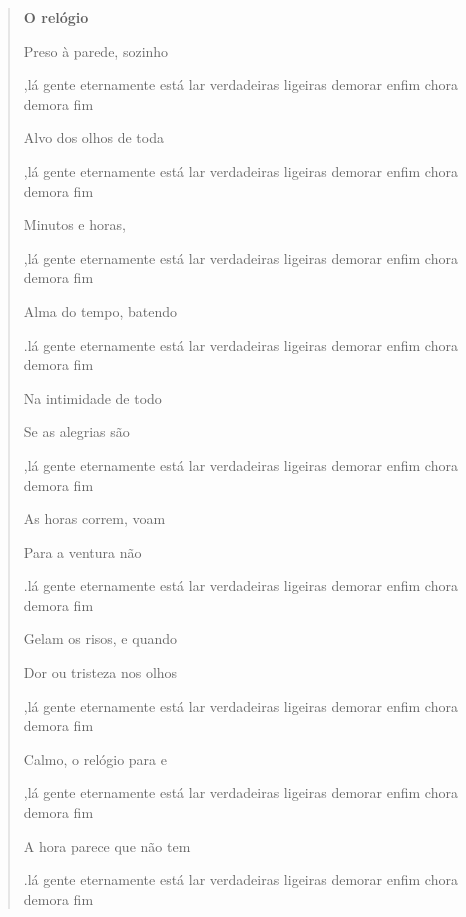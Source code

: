\begin{quote}
\textbf{O relógio}

Preso à parede, sozinho 

\coment,{lá
gente
eternamente
está
lar
verdadeiras
ligeiras
demorar
enfim
chora
demora
fim}

Alvo dos olhos de toda 

\coment,{lá
gente
eternamente
está
lar
verdadeiras
ligeiras
demorar
enfim
chora
demora
fim}

Minutos e horas, 

\coment,{lá
gente
eternamente
está
lar
verdadeiras
ligeiras
demorar
enfim
chora
demora
fim}

Alma do tempo, batendo 

\coment.{lá
gente
eternamente
está
lar
verdadeiras
ligeiras
demorar
enfim
chora
demora
fim}


Na intimidade de todo 


Se as alegrias são 

\coment,{lá
gente
eternamente
está
lar
verdadeiras
ligeiras
demorar
enfim
chora
demora
fim}

As horas correm, voam 


Para a ventura não 

\coment.{lá
gente
eternamente
está
lar
verdadeiras
ligeiras
demorar
enfim
chora
demora
fim}


Gelam os risos, e quando 


Dor ou tristeza nos olhos 

\coment,{lá
gente
eternamente
está
lar
verdadeiras
ligeiras
demorar
enfim
chora
demora
fim}

Calmo, o relógio para e 

\coment,{lá
gente
eternamente
está
lar
verdadeiras
ligeiras
demorar
enfim
chora
demora
fim}

A hora parece que não tem 

\coment.{lá
gente
eternamente
está
lar
verdadeiras
ligeiras
demorar
enfim
chora
demora
fim}

\end{quote}


